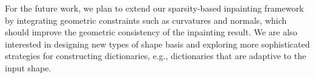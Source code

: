 For the future work, we plan to extend our sparsity-based inpainting framework
by integrating geometric constraints such as curvatures and normals, which
should improve the geometric consistency of the inpainting result. We are also
interested in designing new types of shape basis and exploring more
sophisticated strategies for constructing dictionaries, e.g., dictionaries that
are adaptive to the input shape. 